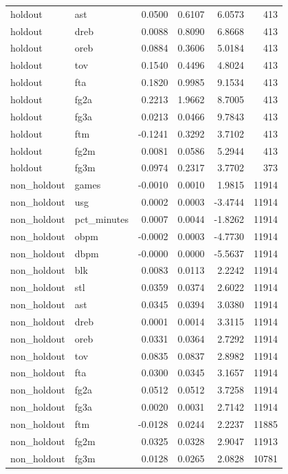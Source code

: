 \begin{table}
\begin{tabular}{llrrrr}
holdout & ast & 0.0500 & 0.6107 & 6.0573 & 413 \\
holdout & dreb & 0.0088 & 0.8090 & 6.8668 & 413 \\
holdout & oreb & 0.0884 & 0.3606 & 5.0184 & 413 \\
holdout & tov & 0.1540 & 0.4496 & 4.8024 & 413 \\
holdout & fta & 0.1820 & 0.9985 & 9.1534 & 413 \\
holdout & fg2a & 0.2213 & 1.9662 & 8.7005 & 413 \\
holdout & fg3a & 0.0213 & 0.0466 & 9.7843 & 413 \\
holdout & ftm & -0.1241 & 0.3292 & 3.7102 & 413 \\
holdout & fg2m & 0.0081 & 0.0586 & 5.2944 & 413 \\
holdout & fg3m & 0.0974 & 0.2317 & 3.7702 & 373 \\
non\_holdout & games & -0.0010 & 0.0010 & 1.9815 & 11914 \\
non\_holdout & usg & 0.0002 & 0.0003 & -3.4744 & 11914 \\
non\_holdout & pct\_minutes & 0.0007 & 0.0044 & -1.8262 & 11914 \\
non\_holdout & obpm & -0.0002 & 0.0003 & -4.7730 & 11914 \\
non\_holdout & dbpm & -0.0000 & 0.0000 & -5.5637 & 11914 \\
non\_holdout & blk & 0.0083 & 0.0113 & 2.2242 & 11914 \\
non\_holdout & stl & 0.0359 & 0.0374 & 2.6022 & 11914 \\
non\_holdout & ast & 0.0345 & 0.0394 & 3.0380 & 11914 \\
non\_holdout & dreb & 0.0001 & 0.0014 & 3.3115 & 11914 \\
non\_holdout & oreb & 0.0331 & 0.0364 & 2.7292 & 11914 \\
non\_holdout & tov & 0.0835 & 0.0837 & 2.8982 & 11914 \\
non\_holdout & fta & 0.0300 & 0.0345 & 3.1657 & 11914 \\
non\_holdout & fg2a & 0.0512 & 0.0512 & 3.7258 & 11914 \\
non\_holdout & fg3a & 0.0020 & 0.0031 & 2.7142 & 11914 \\
non\_holdout & ftm & -0.0128 & 0.0244 & 2.2237 & 11885 \\
non\_holdout & fg2m & 0.0325 & 0.0328 & 2.9047 & 11913 \\
non\_holdout & fg3m & 0.0128 & 0.0265 & 2.0828 & 10781 \\
\bottomrule
\end{tabular}
\end{table}
